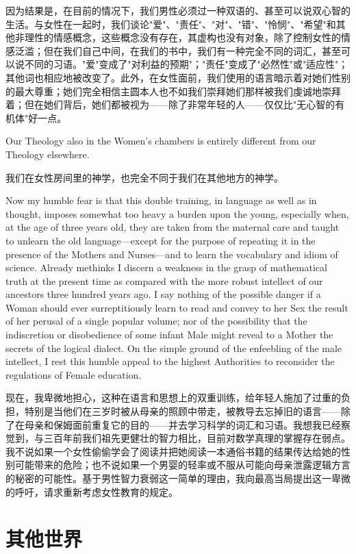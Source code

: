 \documentclass[12pt,UTF8]{ctexbook}
\begin{document}
因为结果是，在目前的情况下，我们男性必须过一种双语的、甚至可以说双心智的生活。与女性在一起时，我们谈论"爱"、"责任"、"对"、"错"、"怜悯"、"希望"和其他非理性的情感概念，这些概念没有存在，其虚构也没有对象，除了控制女性的情感泛滥；但在我们自己中间，在我们的书中，我们有一种完全不同的词汇，甚至可以说不同的习语。"爱"变成了"对利益的预期"；"责任"变成了"必然性"或"适应性"；其他词也相应地被改变了。此外，在女性面前，我们使用的语言暗示着对她们性别的最大尊重；她们完全相信主圆本人也不如我们崇拜她们那样被我们虔诚地崇拜着；但在她们背后，她们都被视为——除了非常年轻的人——仅仅比"无心智的有机体"好一点。

Our Theology also in the Women's chambers is entirely different from our Theology elsewhere.

我们在女性房间里的神学，也完全不同于我们在其他地方的神学。

Now my humble fear is that this double training, in language as well as in thought, imposes somewhat too heavy a burden upon the young, especially when, at the age of three years old, they are taken from the maternal care and taught to unlearn the old language---except for the purpose of repeating it in the presence of the Mothers and Nurses---and to learn the vocabulary and idiom of science. Already methinks I discern a weakness in the grasp of mathematical truth at the present time as compared with the more robust intellect of our ancestors three hundred years ago. I say nothing of the possible danger if a Woman should ever surreptitiously learn to read and convey to her Sex the result of her perusal of a single popular volume; nor of the possibility that the indiscretion or disobedience of some infant Male might reveal to a Mother the secrets of the logical dialect. On the simple ground of the enfeebling of the male intellect, I rest this humble appeal to the highest Authorities to reconsider the regulations of Female education.

现在，我卑微地担心，这种在语言和思想上的双重训练，给年轻人施加了过重的负担，特别是当他们在三岁时被从母亲的照顾中带走，被教导去忘掉旧的语言——除了在母亲和保姆面前重复它的目的——并去学习科学的词汇和习语。我想我已经察觉到，与三百年前我们祖先更健壮的智力相比，目前对数学真理的掌握存在弱点。我不说如果一个女性偷偷学会了阅读并把她阅读一本通俗书籍的结果传达给她的性别可能带来的危险；也不说如果一个男婴的轻率或不服从可能向母亲泄露逻辑方言的秘密的可能性。基于男性智力衰弱这一简单的理由，我向最高当局提出这一卑微的呼吁，请求重新考虑女性教育的规定。

\part{其他世界}
\end{document}
